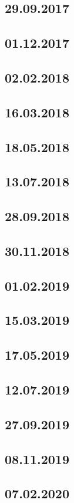 \documentclass[a4paper,12p]{article}
\begin{document}
	\newpage
	\subsection{29.09.2017}
	
	
	
	
	
	\newpage
	\subsection{01.12.2017}
	
	
	
	
	
	\subsection{02.02.2018}
	
	
	\subsection{16.03.2018}
	\subsection{18.05.2018}
	\subsection{13.07.2018}
	\subsection{28.09.2018}
	\subsection{30.11.2018}
	\subsection{01.02.2019}
	
	\newpage
	\subsection{15.03.2019}
		
	
	
	\newpage	
	\subsection{17.05.2019}
	
	
	\newpage
	\subsection{12.07.2019}
	
	
	
	
	
	\newpage
	\subsection{27.09.2019}
	\subsection{08.11.2019}
	\subsection{07.02.2020}
\end{document}
